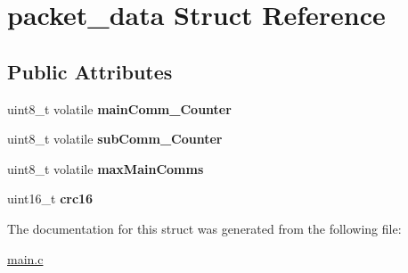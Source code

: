 \hypertarget{structpacket__data}{}\section{packet\+\_\+data Struct Reference}
\label{structpacket__data}
\subsection*{Public Attributes}
\begin{DoxyCompactItemize}
\item 
\mbox{\label{structpacket__data_aac05b35071f30772413054c21bc5c91c}} 
uint8\+\_\+t volatile {\bfseries main\+Comm\+\_\+\+Counter}
\item 
\mbox{\label{structpacket__data_a3794d52da1c84c18ad36bf0740d35dee}} 
uint8\+\_\+t volatile {\bfseries sub\+Comm\+\_\+\+Counter}
\item 
\mbox{\label{structpacket__data_ad4a48900a36ba155f15bc37eef57363a}} 
uint8\+\_\+t volatile {\bfseries max\+Main\+Comms}
\item 
\mbox{\label{structpacket__data_a2d43a736de5ea5f1dbeb8cf48a628ce9}} 
uint16\+\_\+t {\bfseries crc16}
\end{DoxyCompactItemize}


The documentation for this struct was generated from the following file\+:\begin{DoxyCompactItemize}
\item 
\mbox{\hyperlink{main_8c}{main.\+c}}\end{DoxyCompactItemize}
